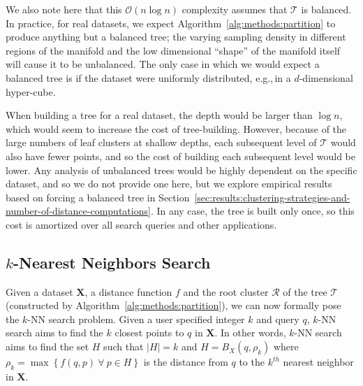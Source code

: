 We also note here that this $\mathcal{O}(n \log n)$ complexity assumes that $\mathcal{T}$ is balanced.
In practice, for real datasets, we expect Algorithm~\ref{alg:methods:partition} to produce anything but a balanced tree; the varying sampling density in different regions of the manifold and the low dimensional ``shape'' of the manifold itself will cause it to be unbalanced.
The only case in which we would expect a balanced tree is if the dataset were uniformly distributed, e.g.,\,in a $d$-dimensional hyper-cube.

When building a tree for a real dataset, the depth would be larger than $\log n$, which would seem to increase the cost of tree-building.
However, because of the large numbers of leaf clusters at shallow depths, each subsequent level of $\mathcal{T}$ would also have fewer points, and so the cost of building each subsequent level would be lower.
Any analysis of unbalanced trees would be highly dependent on the specific dataset, and so we do not provide one here, but we explore empirical results based on forcing a balanced tree in Section~\ref{sec:results:clustering-strategies-and-number-of-distance-computations}.
In any case, the tree is built only once, so this cost is amortized over all search queries and other applications.


\subsection{\texorpdfstring{$k$}{k}-Nearest Neighbors Search}
\label{sec:methods:knn-search}

Given a dataset $\textbf{X}$, a distance function $f$ and the root cluster $\mathcal{R}$ of the tree $\mathcal{T}$ (constructed by Algorithm~\ref{alg:methods:partition}), we can now formally pose the $k$-NN search problem.
Given a user specified integer $k$ and query $q$, $k$-NN search aims to find the $k$ closest points to $q$ in $\textbf{X}$.
In other words, $k$-NN search aims to find the set $H$ such that $|H| = k$ and $H = B_X(q, \rho_k)$ where $\rho_k = \max \left\{ f(q, p) \ \forall \ p \in H \right\}$ is the distance from $q$ to the $k^{th}$ nearest neighbor in $\textbf{X}$.

